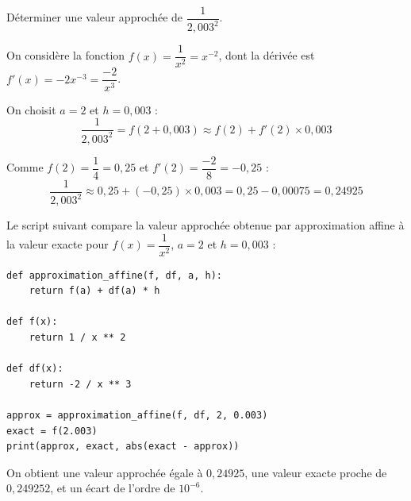 \begin{methode}
	Déterminer une valeur approchée de $\dfrac{1}{2{,}003^2}$.

	\begin{correction}
		On considère la fonction $f(x) = \dfrac{1}{x^2} = x^{-2}$, dont la dérivée est $f'(x) = -2x^{-3} = \dfrac{-2}{x^3}$.

		On choisit $a = 2$ et $h = 0{,}003$ :
		\[
			\dfrac{1}{2{,}003^2} = f(2 + 0{,}003) \approx f(2) + f'(2) \times 0{,}003
		\]

		Comme $f(2) = \dfrac{1}{4} = 0{,}25$ et $f'(2) = \dfrac{-2}{8} = -0{,}25$ :
		\[
			\dfrac{1}{2{,}003^2} \approx 0{,}25 + (-0{,}25) \times 0{,}003 = 0{,}25 - 0{,}00075 = 0{,}24925
		\]

	\end{correction}
\end{methode}

\begin{ex}
	Le script suivant compare la valeur approchée obtenue par approximation affine à la valeur exacte pour $f(x) = \dfrac{1}{x^2}$, $a = 2$ et $h = 0{,}003$ :

	\ms

	\begin{lstlisting}
def approximation_affine(f, df, a, h):
    return f(a) + df(a) * h

def f(x):
    return 1 / x ** 2

def df(x):
    return -2 / x ** 3

approx = approximation_affine(f, df, 2, 0.003)
exact = f(2.003)
print(approx, exact, abs(exact - approx))
\end{lstlisting}

	On obtient une valeur approchée égale à $0{,}24925$, une valeur \og exacte\fg{} proche de $0{,}249252$, et un écart de l'ordre de $10^{-6}$.
\end{ex}


